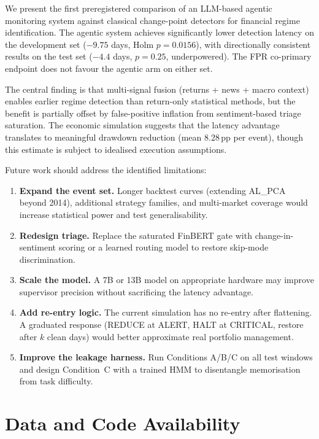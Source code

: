 \documentclass[11pt,a4paper]{article}
\begin{document}
We present the first preregistered comparison of an LLM-based agentic
monitoring system against classical change-point detectors for financial
regime identification. The agentic system achieves significantly lower
detection latency on the development set ($-9.75$ days, Holm
$p = 0.0156$), with directionally consistent results on the test set
($-4.4$ days, $p = 0.25$, underpowered). The FPR co-primary endpoint does
not favour the agentic arm on either set.

The central finding is that multi-signal fusion (returns + news + macro
context) enables earlier regime detection than return-only statistical
methods, but the benefit is partially offset by false-positive inflation
from sentiment-based triage saturation. The economic simulation suggests
that the latency advantage translates to meaningful drawdown reduction
(mean 8.28\,pp per event), though this estimate is subject to idealised
execution assumptions.

Future work should address the identified limitations:

\begin{enumerate}
  \item \textbf{Expand the event set.} Longer backtest curves (extending
        AL\_PCA beyond 2014), additional strategy families, and multi-market
        coverage would increase statistical power and test generalisability.
  \item \textbf{Redesign triage.} Replace the saturated FinBERT gate with
        change-in-sentiment scoring or a learned routing model to restore
        skip-mode discrimination.
  \item \textbf{Scale the model.} A 7B or 13B model on appropriate hardware
        may improve supervisor precision without sacrificing the latency
        advantage.
  \item \textbf{Add re-entry logic.} The current simulation has no re-entry
        after flattening. A graduated response (REDUCE at ALERT, HALT at
        CRITICAL, restore after $k$ clean days) would better approximate
        real portfolio management.
  \item \textbf{Improve the leakage harness.} Run Conditions A/B/C on all
        test windows and design Condition~C with a trained HMM to disentangle
        memorisation from task difficulty.
\end{enumerate}

\section*{Data and Code Availability}
\end{document}
